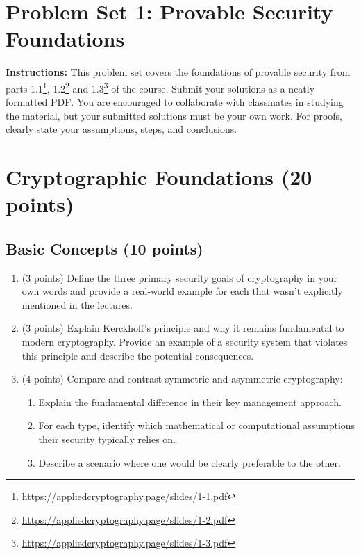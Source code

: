 \documentclass[10pt,a4paper,american]{article}
\begin{document}
\classhandoutheader

\section*{Problem Set 1: Provable Security Foundations}

\begin{tcolorbox}[colframe=OliveGreen!30!white,colback=OliveGreen!5!white]
	\textbf{Instructions:} This problem set covers the foundations of provable security from parts 1.1\footnote{\url{https://appliedcryptography.page/slides/1-1.pdf}}, 1.2\footnote{\url{https://appliedcryptography.page/slides/1-2.pdf}} and 1.3\footnote{\url{https://appliedcryptography.page/slides/1-3.pdf}} of the course. Submit your solutions as a neatly formatted PDF. You are encouraged to collaborate with classmates in studying the material, but your submitted solutions must be your own work. For proofs, clearly state your assumptions, steps, and conclusions.
\end{tcolorbox}

\section{Cryptographic Foundations (20 points)}

\subsection{Basic Concepts (10 points)}

\begin{enumerate}
	\item (3 points) Define the three primary security goals of cryptography in your own words and provide a real-world example for each that wasn't explicitly mentioned in the lectures.

	\item (3 points) Explain Kerckhoff's principle and why it remains fundamental to modern cryptography. Provide an example of a security system that violates this principle and describe the potential consequences.

	\item (4 points) Compare and contrast symmetric and asymmetric cryptography:
	      \begin{enumerate}
		      \item Explain the fundamental difference in their key management approach.
		      \item For each type, identify which mathematical or computational assumptions their security typically relies on.
		      \item Describe a scenario where one would be clearly preferable to the other.
	      \end{enumerate}
\end{enumerate}
\end{document}
